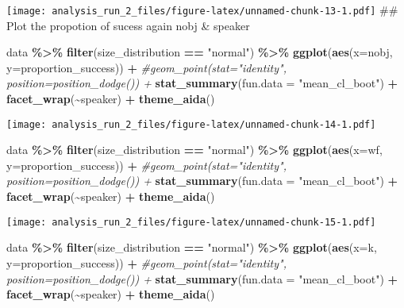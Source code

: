 \documentclass[
]{article}
\newenvironment{Shaded}{\begin{snugshade}}{\end{snugshade}}
\newcommand{\AttributeTok}[1]{\textcolor[rgb]{0.13,0.29,0.53}{#1}}
\newcommand{\CommentTok}[1]{\textcolor[rgb]{0.56,0.35,0.01}{\textit{#1}}}
\newcommand{\FunctionTok}[1]{\textcolor[rgb]{0.13,0.29,0.53}{\textbf{#1}}}
\newcommand{\NormalTok}[1]{#1}
\newcommand{\SpecialCharTok}[1]{\textcolor[rgb]{0.81,0.36,0.00}{\textbf{#1}}}
\newcommand{\StringTok}[1]{\textcolor[rgb]{0.31,0.60,0.02}{#1}}
\begin{document}
\texttt{[image: analysis\_run\_2\_files/figure-latex/unnamed-chunk-13-1.pdf]}
\#\# Plot the propotion of sucess again nobj \& speaker

\begin{Shaded}
\begin{Highlighting}[]
\NormalTok{data }\SpecialCharTok{\%\textgreater{}\%} \FunctionTok{filter}\NormalTok{(size\_distribution }\SpecialCharTok{==} \StringTok{"normal"}\NormalTok{) }\SpecialCharTok{\%\textgreater{}\%}
  \FunctionTok{ggplot}\NormalTok{(}\FunctionTok{aes}\NormalTok{(}\AttributeTok{x=}\NormalTok{nobj, }\AttributeTok{y=}\NormalTok{proportion\_success)) }\SpecialCharTok{+} 
  \CommentTok{\#geom\_point(stat="identity", position=position\_dodge()) + }
  \FunctionTok{stat\_summary}\NormalTok{(}\AttributeTok{fun.data =} \StringTok{"mean\_cl\_boot"}\NormalTok{) }\SpecialCharTok{+}
  \FunctionTok{facet\_wrap}\NormalTok{(}\SpecialCharTok{\textasciitilde{}}\NormalTok{speaker) }\SpecialCharTok{+} 
  \FunctionTok{theme\_aida}\NormalTok{()}
\end{Highlighting}
\end{Shaded}

\texttt{[image: analysis\_run\_2\_files/figure-latex/unnamed-chunk-14-1.pdf]}

\begin{Shaded}
\begin{Highlighting}[]
\NormalTok{data }\SpecialCharTok{\%\textgreater{}\%} \FunctionTok{filter}\NormalTok{(size\_distribution }\SpecialCharTok{==} \StringTok{"normal"}\NormalTok{) }\SpecialCharTok{\%\textgreater{}\%}
  \FunctionTok{ggplot}\NormalTok{(}\FunctionTok{aes}\NormalTok{(}\AttributeTok{x=}\NormalTok{wf, }\AttributeTok{y=}\NormalTok{proportion\_success)) }\SpecialCharTok{+} 
  \CommentTok{\#geom\_point(stat="identity", position=position\_dodge()) + }
  \FunctionTok{stat\_summary}\NormalTok{(}\AttributeTok{fun.data =} \StringTok{"mean\_cl\_boot"}\NormalTok{) }\SpecialCharTok{+}
  \FunctionTok{facet\_wrap}\NormalTok{(}\SpecialCharTok{\textasciitilde{}}\NormalTok{speaker) }\SpecialCharTok{+} 
  \FunctionTok{theme\_aida}\NormalTok{()}
\end{Highlighting}
\end{Shaded}

\texttt{[image: analysis\_run\_2\_files/figure-latex/unnamed-chunk-15-1.pdf]}

\begin{Shaded}
\begin{Highlighting}[]
\NormalTok{data }\SpecialCharTok{\%\textgreater{}\%} \FunctionTok{filter}\NormalTok{(size\_distribution }\SpecialCharTok{==} \StringTok{"normal"}\NormalTok{) }\SpecialCharTok{\%\textgreater{}\%}
  \FunctionTok{ggplot}\NormalTok{(}\FunctionTok{aes}\NormalTok{(}\AttributeTok{x=}\NormalTok{k, }\AttributeTok{y=}\NormalTok{proportion\_success)) }\SpecialCharTok{+} 
  \CommentTok{\#geom\_point(stat="identity", position=position\_dodge()) + }
  \FunctionTok{stat\_summary}\NormalTok{(}\AttributeTok{fun.data =} \StringTok{"mean\_cl\_boot"}\NormalTok{) }\SpecialCharTok{+}
  \FunctionTok{facet\_wrap}\NormalTok{(}\SpecialCharTok{\textasciitilde{}}\NormalTok{speaker) }\SpecialCharTok{+} 
  \FunctionTok{theme\_aida}\NormalTok{()}
\end{Highlighting}
\end{Shaded}
\end{document}
